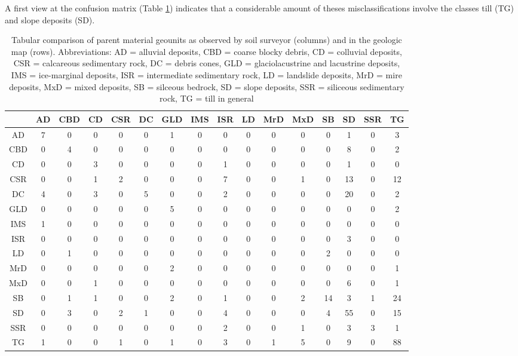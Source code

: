 \documentclass[preprint,12pt,authoryear]{elsarticle}
\begin{document}
 A first view at the confusion matrix (Table \ref{kartiergegenkarte}) indicates that a considerable amount of theses misclassifications involve the classes till (TG)  and slope deposits (SD). 
\begin{table}[ht]
\centering
\tabcolsep=0.06cm
\begin{tabular}{c|ccccccccccccccc}
 & AD & CBD & CD & CSR & DC & GLD & IMS & ISR & LD & MrD & MxD & SB & SD & SSR & TG \\ 
  \hline
AD &   7 &   0 &   0 &   0 &   0 &   1 &   0 &   0 &   0 &   0 &   0 &   0 &   1 &   0 &   3 \\ 
  CBD &   0 &   4 &   0 &   0 &   0 &   0 &   0 &   0 &   0 &   0 &   0 &   0 &   8 &   0 &   2 \\ 
  CD &   0 &   0 &   3 &   0 &   0 &   0 &   0 &   1 &   0 &   0 &   0 &   0 &   1 &   0 &   0 \\ 
  CSR &   0 &   0 &   1 &   2 &   0 &   0 &   0 &   7 &   0 &   0 &   1 &   0 &  13 &   0 &  12 \\ 
  DC &   4 &   0 &   3 &   0 &   5 &   0 &   0 &   2 &   0 &   0 &   0 &   0 &  20 &   0 &   2 \\ 
  GLD &   0 &   0 &   0 &   0 &   0 &   5 &   0 &   0 &   0 &   0 &   0 &   0 &   0 &   0 &   2 \\ 
  IMS &   1 &   0 &   0 &   0 &   0 &   0 &   0 &   0 &   0 &   0 &   0 &   0 &   0 &   0 &   0 \\ 
  ISR &   0 &   0 &   0 &   0 &   0 &   0 &   0 &   0 &   0 &   0 &   0 &   0 &   3 &   0 &   0 \\ 
  LD &   0 &   1 &   0 &   0 &   0 &   0 &   0 &   0 &   0 &   0 &   0 &   2 &   0 &   0 &   0 \\ 
  MrD &   0 &   0 &   0 &   0 &   0 &   2 &   0 &   0 &   0 &   0 &   0 &   0 &   0 &   0 &   1 \\ 
  MxD &   0 &   0 &   1 &   0 &   0 &   0 &   0 &   0 &   0 &   0 &   0 &   0 &   6 &   0 &   1 \\ 
  SB &   0 &   1 &   1 &   0 &   0 &   2 &   0 &   1 &   0 &   0 &   2 &  14 &   3 &   1 &  24 \\ 
  SD &   0 &   3 &   0 &   2 &   1 &   0 &   0 &   4 &   0 &   0 &   0 &   4 &  55 &   0 &  15 \\ 
  SSR &   0 &   0 &   0 &   0 &   0 &   0 &   0 &   2 &   0 &   0 &   1 &   0 &   3 &   3 &   1 \\ 
  TG &   1 &   0 &   0 &   1 &   0 &   1 &   0 &   3 &   0 &   1 &   5 &   0 &   9 &   0 &  88 \\ 
   \hline
\end{tabular}
\caption{Tabular comparison of parent material geounits as observed by soil surveyor (columns) and in the geologic map (rows).
Abbreviations: AD = alluvial deposits, CBD = coarse blocky debris, CD = colluvial deposits, CSR = calcareous sedimentary rock, DC = debris cones, GLD = glaciolacustrine and lacustrine deposits, IMS = ice-marginal deposits, ISR = intermediate sedimentary rock, LD = landslide deposits, MrD = mire deposits, MxD = mixed deposits, SB = silceous bedrock, SD = slope deposits, SSR = siliceous sedimentary rock, TG = till in general} 
\label{kartiergegenkarte}
\end{table}
\end{document}
